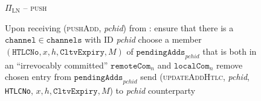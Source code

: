 \begin{figure}[H]
\begin{protocolbox}{$\Pi_{\mathrm{LN}}$ -- \textsc{push}}
\begin{algorithmic}[1]
        \State Upon receiving (\textsc{pushAdd}, \textit{pchid}) from
        \environment:
        \label{alg:protocol:pushadd:start}
        \Indent
          \State ensure that there is a $\mathtt{channel} \in \mathtt{channels}$
          with ID \textit{pchid}
          \State choose a member $\left(\mathtt{HTLCNo}, x, h,
          \mathtt{CltvExpiry}, M\right)$ of
          $\mathtt{pendingAdds}_{\mathit{pchid}}$ that is both in an
          ``irrevocably committed'' $\mathtt{remoteCom}_n$ and
          $\mathtt{localCom}_n$
          \label{alg:protocol:pay:pushadd:choose}
          \State remove chosen entry from
          $\mathtt{pendingAdds}_{\mathit{pchid}}$
          \State send (\textsc{updateAddHtlc}, \textit{pchid}, \texttt{HTLCNo},
          $x, h, \mathtt{CltvExpiry}, M$) to \textit{pchid} counterparty
          \label{alg:protocol:pushadd:end}
        \EndIndent
      \end{algorithmic}
    \end{protocolbox}
    \caption{}
    \label{alg:protocol:pay:push}
  \end{figure}

